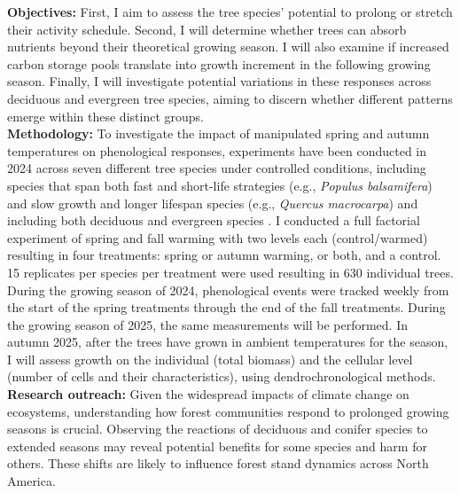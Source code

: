 \documentclass{article}
\begin{document}
\textbf {Objectives:} First, I aim to assess the tree species' potential to prolong or stretch their activity schedule. Second, I will determine whether trees can absorb nutrients beyond their theoretical growing season. I will also examine if increased carbon storage pools translate into growth increment in the following growing season. Finally, I will investigate potential variations in these responses across deciduous and evergreen tree species, aiming to discern whether different patterns emerge within these distinct groups.\\
\textbf {Methodology:} To investigate the impact of manipulated spring and autumn temperatures on phenological responses, experiments have been conducted in 2024 across seven different tree species under controlled conditions, including species that span both fast and short-life strategies (e.g., \emph{Populus balsamifera}) and slow growth and longer lifespan species (e.g., \emph{Quercus macrocarpa}) and including both deciduous and evergreen species \citep{jonsson_annual_2010}. I conducted a full factorial experiment of spring and fall warming with two levels each (control/warmed) resulting in four treatments: spring or autumn warming, or both, and a control. 15 replicates per species per treatment were used resulting in 630 individual trees. %
During the growing season of 2024, phenological events were tracked weekly from the start of the spring treatments through the end of the fall treatments. During the growing season of 2025, the same measurements will be performed. In autumn 2025, after the trees have grown in ambient temperatures for the season, I will assess growth on the individual (total biomass) and the cellular level (number of cells and their characteristics), using dendrochronological methods. \\
\textbf{Research outreach:} Given the widespread impacts of climate change on ecosystems, understanding how forest communities respond to prolonged growing seasons is crucial. Observing the reactions of deciduous and conifer species to extended seasons may reveal potential benefits for some species and harm for others. These shifts are likely to influence forest stand dynamics across North America.


\end{document}
